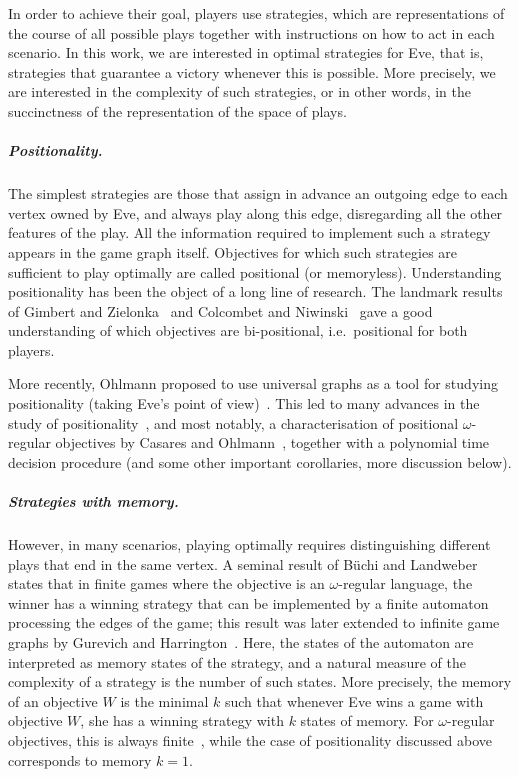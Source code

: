 \documentclass[a4paper,UKenglish,cleveref, thm-restate]{lipics-v2021}
\newcommand{\oo}{\omega}
\begin{document}
In order to achieve their goal, players use strategies, which are representations of the course of all possible plays together with instructions on how to act in each scenario.
In this work, we are interested in optimal strategies for Eve, that is, strategies that guarantee a victory whenever this is possible. More precisely, we are interested in the complexity of such strategies, or in other words, in the succinctness of the representation of the space of plays.

\subparagraph*{Positionality.}
The simplest strategies are those that assign in advance an outgoing edge to each vertex owned by Eve, and always play along this edge, disregarding all the other features of the play.
All the information required to implement such a strategy appears in the game graph itself.
Objectives for which such strategies are sufficient to play optimally are called positional (or memoryless).
Understanding positionality has been the object of a long line of research. The landmark results of Gimbert and Zielonka~\cite{GZ05} and Colcombet and Niwinski~\cite{CN06} gave a good understanding of which objectives are bi-positional, i.e.~positional for both players.

More recently, Ohlmann proposed to use universal graphs as a tool for studying positionality (taking  Eve's point of view)~\cite{Ohlmann23}.
This led to many advances in the study of positionality~\cite{BCRV24HalfJournal,OS24Sigma2}, and most notably, a characterisation of positional $\omega$-regular objectives by Casares and Ohlmann~\cite{CO24Positional}, together with a polynomial time decision procedure (and some other important corollaries, more discussion below).

\subparagraph*{Strategies with memory.} 
However, in many scenarios, playing optimally requires distinguishing different plays that end in the same vertex.
A seminal result of B\"uchi and Landweber~\cite{BL69Strategies} states that in finite games where the objective is an $\oo$-regular language, the winner has a winning strategy that can be implemented by a finite automaton processing the edges of the game; this result was later extended to infinite game graphs by Gurevich and Harrington~\cite{Gurevich1982trees}.
Here, the states of the automaton are interpreted as memory states of the strategy, and a natural measure of the complexity of a strategy is the number of such states.
More precisely, the memory of an objective $W$ is the minimal $k$ such that whenever Eve wins a game with objective $W$, she has a winning strategy with $k$ states of memory.
For $\oo$-regular objectives, this is always finite~\cite{BL69Strategies,Gurevich1982trees}, while the case of positionality discussed above corresponds to memory $k=1$.
\end{document}

